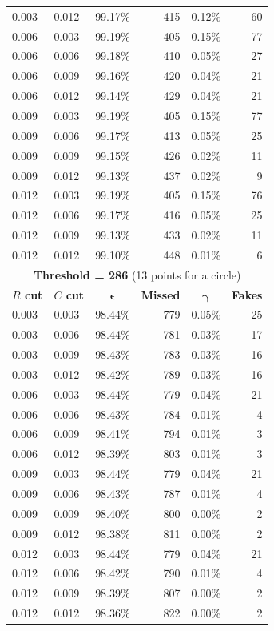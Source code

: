 \documentclass[11pt]{scrreprt}
\begin{document}
\begin{longtable}{llcrcr}
0.003 & 0.012 & 99.17\% & 415 & 0.12\% & 60 \\
0.006 & 0.003 & 99.19\% & 405 & 0.15\% & 77 \\
0.006 & 0.006 & 99.18\% & 410 & 0.05\% & 27 \\
0.006 & 0.009 & 99.16\% & 420 & 0.04\% & 21 \\
0.006 & 0.012 & 99.14\% & 429 & 0.04\% & 21 \\
0.009 & 0.003 & 99.19\% & 405 & 0.15\% & 77 \\
0.009 & 0.006 & 99.17\% & 413 & 0.05\% & 25 \\
0.009 & 0.009 & 99.15\% & 426 & 0.02\% & 11 \\
0.009 & 0.012 & 99.13\% & 437 & 0.02\% & 9 \\
0.012 & 0.003 & 99.19\% & 405 & 0.15\% & 76 \\
0.012 & 0.006 & 99.17\% & 416 & 0.05\% & 25 \\
0.012 & 0.009 & 99.13\% & 433 & 0.02\% & 11 \\
0.012 & 0.012 & 99.10\% & 448 & 0.01\% & 6 \\
\bottomrule
\toprule
\multicolumn{6}{c}{\textbf{Threshold = 286} (13 points for a circle)}\\
\midrule
\textbf{$R$ cut} & \textbf{$C$ cut} & $\boldsymbol{\epsilon}$ & \textbf{Missed} & $\boldsymbol{\gamma}$ & \textbf{Fakes} \\
\midrule
0.003 & 0.003 & 98.44\% & 779 & 0.05\% & 25 \\
0.003 & 0.006 & 98.44\% & 781 & 0.03\% & 17 \\
0.003 & 0.009 & 98.43\% & 783 & 0.03\% & 16 \\
0.003 & 0.012 & 98.42\% & 789 & 0.03\% & 16 \\
0.006 & 0.003 & 98.44\% & 779 & 0.04\% & 21 \\
0.006 & 0.006 & 98.43\% & 784 & 0.01\% & 4 \\
0.006 & 0.009 & 98.41\% & 794 & 0.01\% & 3 \\
0.006 & 0.012 & 98.39\% & 803 & 0.01\% & 3 \\
0.009 & 0.003 & 98.44\% & 779 & 0.04\% & 21 \\
0.009 & 0.006 & 98.43\% & 787 & 0.01\% & 4 \\
0.009 & 0.009 & 98.40\% & 800 & 0.00\% & 2 \\
0.009 & 0.012 & 98.38\% & 811 & 0.00\% & 2 \\
0.012 & 0.003 & 98.44\% & 779 & 0.04\% & 21 \\
0.012 & 0.006 & 98.42\% & 790 & 0.01\% & 4 \\
0.012 & 0.009 & 98.39\% & 807 & 0.00\% & 2 \\
0.012 & 0.012 & 98.36\% & 822 & 0.00\% & 2 \\
\bottomrule
\end{longtable}
\end{document}
